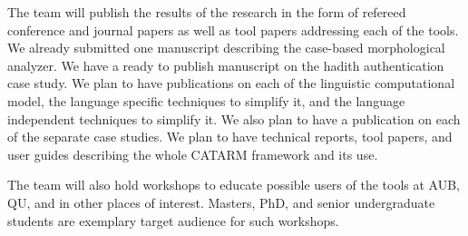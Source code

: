 \documentclass[12pt]{article}
\begin{document}
The team will publish the results of the research in the form 
of refereed conference and journal papers as well as tool papers 
addressing each of the tools. 
We already submitted one manuscript describing the case-based
morphological analyzer. 
We have a ready to publish manuscript on the hadith authentication
case study. 
We plan to have publications on each of the 
linguistic computational model, the language specific techniques
to simplify it, and the language independent techniques to simplify
it. 
We also plan to have a publication on each of the separate case 
studies. 
We plan to have technical reports, tool papers, and user
guides describing
the whole CATARM framework and its use. 

The team will also hold workshops to educate possible users of the
tools at AUB, QU, and in other places of interest. 
Masters,  PhD, and senior undergraduate students are 
exemplary target audience for such workshops.

\pagebreak
{}
%
%

%
{\small
  
}
\end{document}

